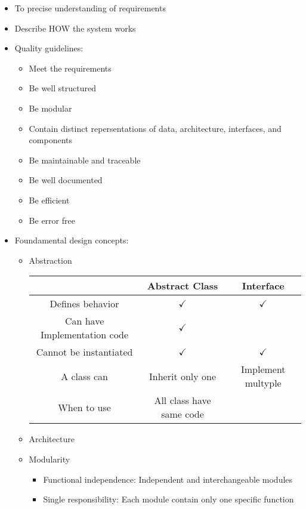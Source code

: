 \documentclass[12pt,openany]{book}
\begin{document}
\begin{itemize}
    \item To precise understanding of requirements
    \item Describe HOW the system works
    \item Quality guidelines:
    \begin{itemize}
        \item Meet the requirements
        \item Be well structured
        \item Be modular
        \item Contain distinct repersentations of data, architecture, interfaces, and components
        \item Be maintainable and traceable
        \item Be well documented
        \item Be efficient
        \item Be error free
    \end{itemize}
    \item Foundamental design concepts:
    \begin{itemize}
        \item Abstraction
        \begin{table}[H]
            \centering
            \begin{tabular}{c|cc}
                \toprule
                &\textbf{Abstract Class} & \textbf{Interface}\\
                \midrule
                Defines behavior & $\checkmark$ & $\checkmark$\\
                Can have Implementation code & $\checkmark$ &\\
                Cannot be instantiated & $\checkmark$ & $\checkmark$\\
                A class can & Inherit only one & Implement multyple\\
                When to use & All class have same code &\\
                \bottomrule
            \end{tabular}
        \end{table}
        \item Architecture
        \item Modularity
        \begin{itemize}
            \item Functional independence: Independent and interchangeable modules
            \item Single responsibility: Each module contain only one specific function

\end{itemize}
\end{itemize}
\end{itemize}
\end{document}
